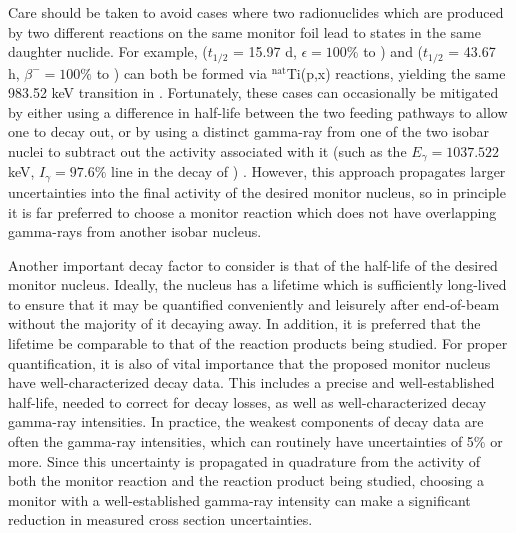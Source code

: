 Care should be taken to avoid cases where two radionuclides which are produced by two different reactions on the same monitor foil lead to states in the same daughter nuclide.  
For example,   ($t_{1/2}$ = 15.97 d, $\epsilon=100\%$ to ) and   ($t_{1/2}$ = 43.67 h, $\beta^-=100\%$ to ) can both be formed via $^\text{nat}$Ti(p,x) reactions, yielding the same 983.52 keV transition in  \cite{Burrows2006}.
Fortunately, these cases can occasionally be mitigated by either using a difference in half-life between the two feeding pathways to allow one to decay out, or by using a distinct gamma-ray from one of the two isobar nuclei to subtract out the activity associated with it (such as the $E_\gamma=1037.522$ keV, $I_\gamma=97.6\%$ line in the decay of ) \cite{Burrows2006}.
However, this approach propagates larger uncertainties into the final activity of the desired monitor nucleus, so in principle it is far preferred to choose a monitor reaction which does not have overlapping gamma-rays from another isobar nucleus.

Another important decay factor to consider is that of the half-life of the desired monitor nucleus.
Ideally, the nucleus has a lifetime which is sufficiently long-lived to ensure that it may be quantified  conveniently and leisurely after end-of-beam without the majority of it decaying away.
In addition, it is preferred that the lifetime be comparable to that of the reaction products being studied. 
For proper quantification, it is also of vital importance that the proposed monitor nucleus have well-characterized decay data.
This includes a precise and well-established half-life,  needed to  correct for decay losses, as well as well-characterized decay gamma-ray intensities.
In practice, the weakest components of decay data are often the gamma-ray intensities, which can routinely have uncertainties of 5\% or more.
Since this uncertainty is propagated in quadrature from the activity of both the monitor reaction and the reaction product being studied, choosing a monitor with a well-established gamma-ray intensity can make a significant reduction in measured cross section uncertainties.


